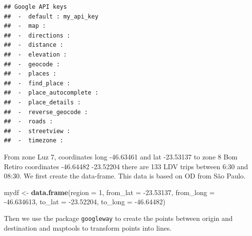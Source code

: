 \documentclass[12pt,graybox,envcountchap,sectrefs]{krantz}
\makeatletter
\newenvironment{Shaded}{\begin{snugshade}}{\end{snugshade}}
\newcommand{\KeywordTok}[1]{\textcolor[rgb]{0.13,0.29,0.53}{\textbf{#1}}}
\newcommand{\DataTypeTok}[1]{\textcolor[rgb]{0.13,0.29,0.53}{#1}}
\newcommand{\DecValTok}[1]{\textcolor[rgb]{0.00,0.00,0.81}{#1}}
\newcommand{\FloatTok}[1]{\textcolor[rgb]{0.00,0.00,0.81}{#1}}
\newcommand{\StringTok}[1]{\textcolor[rgb]{0.31,0.60,0.02}{#1}}
\newcommand{\NormalTok}[1]{#1}
\newenvironment{kframe}{%
\medskip{}
\setlength{\fboxsep}{.8em}
 \def\at@end@of@kframe{}%
 \ifinner\ifhmode%
  \def\at@end@of@kframe{\end{minipage}}%
  \begin{minipage}{\columnwidth}%
 \fi\fi%
 \def\FrameCommand##1{\hskip\@totalleftmargin \hskip-\fboxsep
 \colorbox{shadecolor}{##1}\hskip-\fboxsep
     \hskip-\linewidth \hskip-\@totalleftmargin \hskip\columnwidth}%
 \MakeFramed {\advance\hsize-\width
   \@totalleftmargin\z@ \linewidth\hsize
   \@setminipage}}%
 {\par\unskip\endMakeFramed%
 \at@end@of@kframe}
\renewenvironment{Shaded}{\begin{kframe}}{\end{kframe}}
\theoremstyle{definition}
\theoremstyle{definition}
\theoremstyle{definition}
\theoremstyle{remark}
\makeatother
\begin{document}
\begin{verbatim}
## Google API keys
##  -  default : my_api_key 
##  -  map :  
##  -  directions :  
##  -  distance :  
##  -  elevation :  
##  -  geocode :  
##  -  places :  
##  -  find_place :  
##  -  place_autocomplete :  
##  -  place_details :  
##  -  reverse_geocode :  
##  -  roads :  
##  -  streetview :  
##  -  timezone :
\end{verbatim}

From zone Luz 7, coordinates long -46.63461 and lat -23.53137 to zone 8
Bom Retiro coordinates -46.64482 -23.52204 there are 133 LDV trips
between 6:30 and 08:30. We first create the data-frame. This data is
based on OD from São Paulo.

\begin{Shaded}
\begin{Highlighting}[]
\NormalTok{mydf <-}\StringTok{ }\KeywordTok{data.frame}\NormalTok{(}\DataTypeTok{region =} \DecValTok{1}\NormalTok{,}
                   \DataTypeTok{from_lat =} \FloatTok{-23.53137}\NormalTok{,}
                   \DataTypeTok{from_long =} \FloatTok{-46.634613}\NormalTok{,}
                   \DataTypeTok{to_lat =} \FloatTok{-23.52204}\NormalTok{,}
                   \DataTypeTok{to_long =} \FloatTok{-46.64482}\NormalTok{)}
\end{Highlighting}
\end{Shaded}

Then we use the package \texttt{googleway} to create the points between
origin and destination and maptools to transform points into lines.
\end{document}
